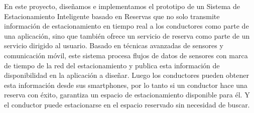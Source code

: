 En este proyecto, diseñamos e implementamos el prototipo de un Sistema de Estacionamiento Inteligente basado en Reservas  que no solo transmite información de estacionamiento en tiempo real a los conductores como parte de una aplicación, sino que también ofrece un servicio de reserva como parte de un servicio dirigido al usuario. Basado en técnicas avanzadas de sensores y comunicación móvil, este sistema procesa flujos de datos de sensores con marca de tiempo de la red del estacionamiento y publica esta información de disponibilidad en la aplicación a diseñar. Luego los conductores pueden obtener esta información desde sus smartphones, por lo tanto si un conductor hace una reserva con éxito, garantiza un espacio de estacionamiento disponible para él. Y el conductor puede estacionarse en el espacio reservado sin necesidad de buscar.